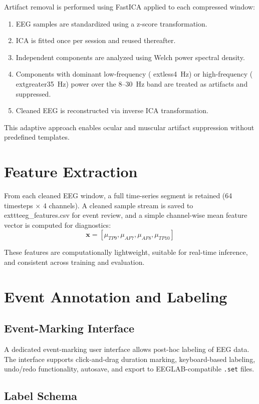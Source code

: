 \documentclass[11pt]{article}
\begin{document}
Artifact removal is performed using FastICA applied to each compressed window:
\begin{enumerate}
    \item EEG samples are standardized using a z-score transformation.
    \item ICA is fitted once per session and reused thereafter.
    \item Independent components are analyzed using Welch power spectral density.
    \item Components with dominant low-frequency (	extless{}4~Hz) or high-frequency (	extgreater{}35~Hz) power over the 8--30~Hz band are treated as artifacts and suppressed.
    \item Cleaned EEG is reconstructed via inverse ICA transformation.
\end{enumerate}

This adaptive approach enables ocular and muscular artifact suppression without predefined templates.

\section{Feature Extraction}

From each cleaned EEG window, a full time-series segment is retained (64 timesteps $\times$ 4 channels). A cleaned sample stream is saved to 	exttt{eeg\_features.csv} for event review, and a simple channel-wise mean feature vector is computed for diagnostics:
\[
\mathbf{x} = [\mu_{TP9}, \mu_{AF7}, \mu_{AF8}, \mu_{TP10}]
\]

These features are computationally lightweight, suitable for real-time inference, and consistent across training and evaluation.

\section{Event Annotation and Labeling}

\subsection{Event-Marking Interface}

A dedicated event-marking user interface allows post-hoc labeling of EEG data. The interface supports click-and-drag duration marking, keyboard-based labeling, undo/redo functionality, autosave, and export to EEGLAB-compatible \texttt{.set} files.

\subsection{Label Schema}
\end{document}
